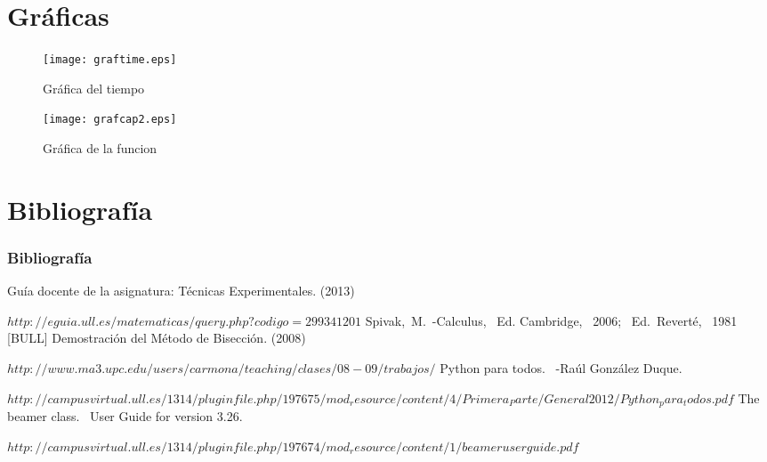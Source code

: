 \documentclass{beamer}
\begin{document}
\section{Gráficas}
\begin{frame}
\begin{figure}[!th]
\begin{center}
\texttt{[image: graftime.eps]}
\caption{Gráfica del tiempo}
\label{fig:1}
\end{center}
\end{figure}
\end{frame}

\begin{frame}
\begin{figure}[!th]
\begin{center}
\texttt{[image: grafcap2.eps]}
\caption{Gráfica de la funcion}
\label{fig:1}
\end{center}
\end{figure}
\end{frame}
\section{Bibliografía}
\begin{frame}
  \frametitle{Bibliografía}

  \begin{thebibliography}{10}
    Gu\'ia docente de la asignatura: T\'ecnicas Experimentales.
    (2013)
    
    {\tiny $http://eguia.ull.es/matematicas/query.php?codigo=299341201$}
    Spivak,~M.~-Calculus,~ Ed. Cambridge,~ 2006;~ Ed.~Revert\'e,~ 1981~ [BULL]
  Demostraci\'on del M\'etodo de Bisecci\'on.
  (2008)
  
  {\tiny $http://www.ma3.upc.edu/users/carmona/teaching/clases/08-09/trabajos/$}
  Python para todos. ~-Ra\'ul Gonz\'alez Duque.
  
  {\tiny $http://campusvirtual.ull.es/1314/pluginfile.php/197675/mod_resource/content/4/Primera_Parte/General2012/Python_para_todos.pdf$}
  The beamer class. ~User Guide for version 3.26.
  
  {\tiny $http://campusvirtual.ull.es/1314/pluginfile.php/197674/mod_resource/content/1/beameruserguide.pdf$}
  \end{thebibliography}
\end{frame}
\end{document}
